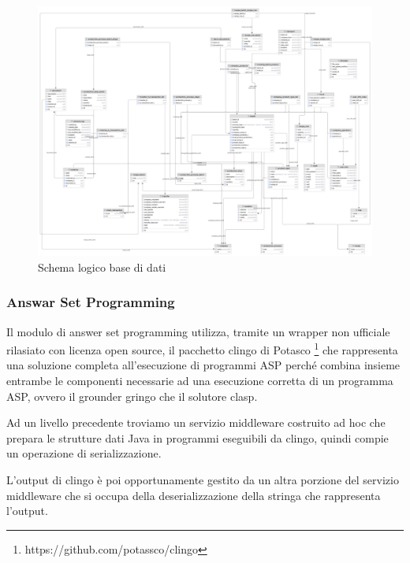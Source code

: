 \documentclass[a4paper,11pt]{article}
\begin{document}
\begin{figure}[H]
  \includegraphics[height=1\linewidth, angle=-90]{img/db.png}
  \caption{Schema logico base di dati}
  \label{fig:schemauml}
\end{figure}

\subsubsection{Answar Set Programming}

Il modulo di answer set programming utilizza, tramite un wrapper non ufficiale rilasiato con licenza open source, il pacchetto clingo di Potasco \footnote{https://github.com/potassco/clingo} che rappresenta una soluzione completa all'esecuzione di programmi ASP perché combina insieme entrambe le componenti necessarie ad una esecuzione corretta di un programma ASP, ovvero il grounder gringo che il solutore clasp.

Ad un livello precedente troviamo un servizio middleware costruito ad hoc che prepara le strutture dati Java in programmi eseguibili da clingo, quindi compie un operazione di serializzazione.

L'output di clingo è poi opportunamente gestito da un altra porzione del servizio middleware che si occupa della deserializzazione della stringa che rappresenta l'output.
\end{document}

